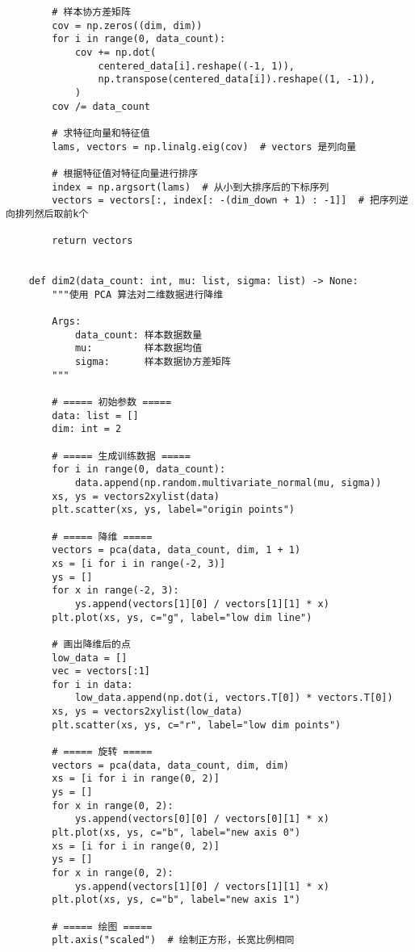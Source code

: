 \begin{verbatim}
        # 样本协方差矩阵
        cov = np.zeros((dim, dim))
        for i in range(0, data_count):
            cov += np.dot(
                centered_data[i].reshape((-1, 1)),
                np.transpose(centered_data[i]).reshape((1, -1)),
            )
        cov /= data_count

        # 求特征向量和特征值
        lams, vectors = np.linalg.eig(cov)  # vectors 是列向量

        # 根据特征值对特征向量进行排序
        index = np.argsort(lams)  # 从小到大排序后的下标序列
        vectors = vectors[:, index[: -(dim_down + 1) : -1]]  # 把序列逆向排列然后取前k个

        return vectors


    def dim2(data_count: int, mu: list, sigma: list) -> None:
        """使用 PCA 算法对二维数据进行降维

        Args:
            data_count: 样本数据数量
            mu:         样本数据均值
            sigma:      样本数据协方差矩阵
        """

        # ===== 初始参数 =====
        data: list = []
        dim: int = 2

        # ===== 生成训练数据 =====
        for i in range(0, data_count):
            data.append(np.random.multivariate_normal(mu, sigma))
        xs, ys = vectors2xylist(data)
        plt.scatter(xs, ys, label="origin points")

        # ===== 降维 =====
        vectors = pca(data, data_count, dim, 1 + 1)
        xs = [i for i in range(-2, 3)]
        ys = []
        for x in range(-2, 3):
            ys.append(vectors[1][0] / vectors[1][1] * x)
        plt.plot(xs, ys, c="g", label="low dim line")

        # 画出降维后的点
        low_data = []
        vec = vectors[:1]
        for i in data:
            low_data.append(np.dot(i, vectors.T[0]) * vectors.T[0])
        xs, ys = vectors2xylist(low_data)
        plt.scatter(xs, ys, c="r", label="low dim points")

        # ===== 旋转 =====
        vectors = pca(data, data_count, dim, dim)
        xs = [i for i in range(0, 2)]
        ys = []
        for x in range(0, 2):
            ys.append(vectors[0][0] / vectors[0][1] * x)
        plt.plot(xs, ys, c="b", label="new axis 0")
        xs = [i for i in range(0, 2)]
        ys = []
        for x in range(0, 2):
            ys.append(vectors[1][0] / vectors[1][1] * x)
        plt.plot(xs, ys, c="b", label="new axis 1")

        # ===== 绘图 =====
        plt.axis("scaled")  # 绘制正方形，长宽比例相同



\end{verbatim}
